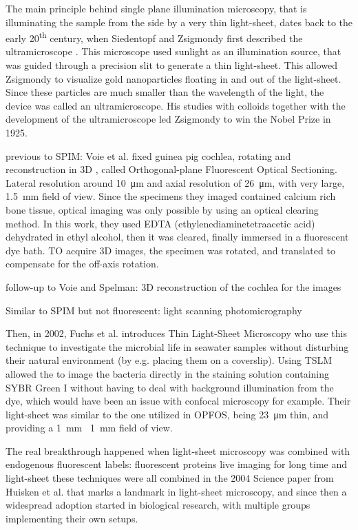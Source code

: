 \documentclass{diploma_style}
\begin{document}
The main principle behind single plane illumination microscopy, that is illuminating the sample from the side by a very thin light-sheet, dates back to the early 20\textsuperscript{th} century, when Siedentopf and Zsigmondy first described the ultramicroscope \cite{siedentopf_uber_1902}. This microscope used sunlight as an illumination source, that was guided through a precision slit to generate a thin light-sheet. This allowed Zsigmondy to visualize gold nanoparticles floating in and out of the light-sheet. Since these particles are much smaller than the wavelength of the light, the device was called an ultramicroscope. His studies with colloids together with the development of the ultramicroscope led Zsigmondy to win the Nobel Prize in 1925.

previous to SPIM:
Voie et al. fixed guinea pig cochlea, rotating and reconstruction in 3D \cite{voie_orthogonal-plane_1993}, called Orthogonal-plane Fluorescent Optical Sectioning. Lateral resolution around \SI{10}{\micro m} and axial resolution of \SI{26}{\micro m}, with very large, \SI{1.5}{mm} field of view. Since the specimens they imaged contained calcium rich bone tissue, optical imaging was only possible by using an optical clearing method. In this work, they used EDTA (ethylenediaminetetraacetic acid) dehydrated in ethyl alcohol, then it was cleared, finally immersed in a fluorescent dye bath. TO acquire 3D images, the specimen was rotated, and translated to compensate for the off-axis rotation.

follow-up to Voie and Spelman: \cite{voie_three-dimensional_1995} 3D reconstruction of the cochlea for the images

Similar to SPIM but not fluorescent: light scanning photomicrography \cite{huber_3d_2001}

Then, in 2002, Fuchs et al. introduces Thin  Light-Sheet Microscopy \cite{fuchs_thin_2002} who use this technique to investigate the microbial life in seawater samples without disturbing their natural environment (by e.g. placing them on a coverslip). Using TSLM allowed the to image the bacteria directly in the staining solution containing SYBR Green I without having to deal with background illumination from the dye, which would have been an issue with confocal microscopy for example. Their light-sheet was similar to the one utilized in OPFOS, being \SI{23}{\micro m} thin, and providing a \SI{1}{mm} \ \SI{1}{mm} field of view.

The real breakthrough happened when light-sheet microscopy was combined with 
endogenous fluorescent labels: fluorescent proteins
live imaging for long time
and light-sheet
these techniques were all combined in the 2004 Science paper from Huisken et al. that marks a landmark in light-sheet microscopy, and since then a widespread adoption started  in biological research, with multiple groups implementing their own setups.
\end{document}
